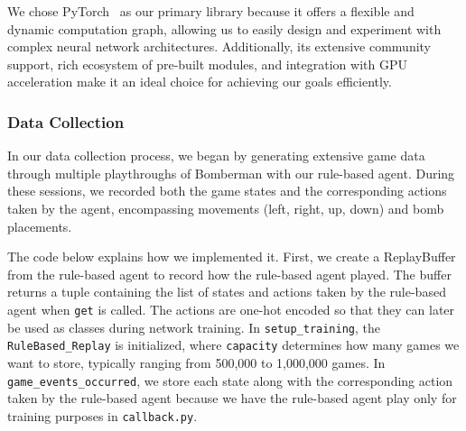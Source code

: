 We chose PyTorch~\cite{Onl:pytorch} as our primary library because it offers a flexible and dynamic computation graph, allowing us to easily design and 
experiment with complex neural network architectures. Additionally, its extensive community support, rich ecosystem of pre-built modules, 
and integration with GPU acceleration make it an ideal choice for achieving our goals efficiently.

\subsubsection{Data Collection}

In our data collection process, we began by generating extensive game data through multiple playthroughs of Bomberman with 
our rule-based agent. During these sessions, we recorded both the game states and the corresponding actions taken by the agent, 
encompassing movements (left, right, up, down) and bomb placements.

The code below explains how we implemented it. First, we create a ReplayBuffer~\cite{Onl:replaybuff} from the rule-based agent 
to record how the rule-based agent played. The buffer returns a tuple containing the list of states and actions 
taken by the rule-based agent when \verb|get| is called. The actions are one-hot encoded so that they can later be used as 
classes during network training. In \verb|setup_training|, the \verb|RuleBased_Replay| is initialized, where \verb|capacity| determines 
how many games we want to store, typically ranging from 500,000 to 1,000,000 games. In \verb|game_events_occurred|, 
we store each state along with the corresponding action taken by the rule-based agent because we have the 
rule-based agent play only for training purposes in \verb|callback.py|.

